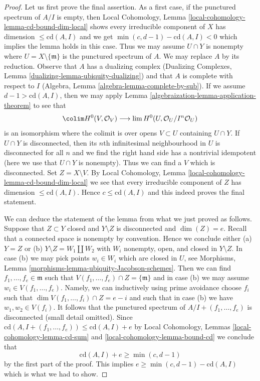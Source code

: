 \begin{proof}

Let us first prove the final assertion. As a first case, if the punctured
spectrum of $A/I$ is empty, then
Local Cohomology, Lemma \ref{local-cohomology-lemma-cd-bound-dim-local}
shows every irreducible component of $X$ has dimension
$\leq \text{cd}(A, I)$ and we get $\min(c, d - 1) - \text{cd}(A, I) < 0$
which implies the lemma holds in this case. Thus we may assume
$U \cap Y$ is nonempty where $U = X \setminus \{\mathfrak m\}$
is the punctured spectrum of $A$. We may replace $A$ by its reduction.
Observe that $A$ has a dualizing complex
(Dualizing Complexes, Lemma \ref{dualizing-lemma-ubiquity-dualizing})
and that $A$ is complete with respect to $I$
(Algebra, Lemma \ref{algebra-lemma-complete-by-sub}).
If we assume $d - 1 > \text{cd}(A, I)$, then we may apply
Lemma \ref{algebraization-lemma-application-theorem} to see that
$$
\colim H^0(V, \mathcal{O}_V)
\longrightarrow
\lim H^0(U, \mathcal{O}_U/I^n\mathcal{O}_U)
$$
is an isomorphism where the colimit is over opens $V \subset U$
containing $U \cap Y$. If $U \cap Y$ is disconnected, then
its $n$th infinitesimal neighbourhood in $U$ is disconnected
for all $n$ and we find the
right hand side has a nontrivial idempotent (here we use
that $U \cap Y$ is nonempty).
Thus we can find a $V$ which is disconnected.
Set $Z = X \setminus V$. By
Local Cohomology, Lemma \ref{local-cohomology-lemma-cd-bound-dim-local}
we see that every irreducible component of $Z$ has dimension
$\leq \text{cd}(A, I)$. Hence $c \leq \text{cd}(A, I)$ and this
indeed proves the final statement.

\medskip\noindent
We can deduce the statement of the lemma from what we just proved
as follows. Suppose that $Z \subset Y$ closed and $Y \setminus Z$ is
disconnected and $\dim(Z) = e$. Recall that a connected space is nonempty
by convention. Hence we conclude either (a) $Y = Z$ or (b)
$Y \setminus Z = W_1 \amalg W_2$ with $W_i$ nonempty, open, and closed
in $Y \setminus Z$. In case (b) we may pick points $w_i \in W_i$
which are closed in $U$, see
Morphisms, Lemma \ref{morphisms-lemma-ubiquity-Jacobson-schemes}.
Then we can find $f_1, \ldots, f_e \in \mathfrak m$
such that $V(f_1, \ldots, f_e) \cap Z = \{\mathfrak m\}$
and in case (b) we may assume $w_i \in V(f_1, \ldots, f_e)$.
Namely, we can inductively using prime avoidance
choose $f_i$ such that $\dim V(f_1, \ldots, f_i) \cap Z = e - i$
and such that in case (b) we have $w_1, w_2 \in V(f_i)$.
It follows that the punctured spectrum of $A/I + (f_1, \ldots, f_e)$
is disconnected (small detail omitted). Since
$\text{cd}(A, I + (f_1, \ldots, f_e)) \leq \text{cd}(A, I) + e$ by
Local Cohomology, Lemmas \ref{local-cohomology-lemma-cd-sum} and
\ref{local-cohomology-lemma-bound-cd} we conclude that
$$
\text{cd}(A, I) + e \geq \min(c, d - 1)
$$
by the first part of the proof. This implies
$e \geq \min(c, d - 1) - \text{cd}(A, I)$ which is what we had to show.
\end{proof}

